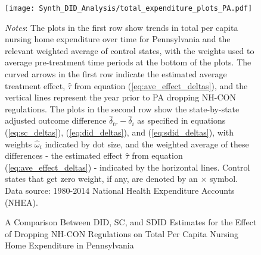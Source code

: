 \documentclass[../Main.tex]{subfiles}
\begin{document}
\newpage
\begin{figure}[t] 
	\begin{center}
	\caption{\label{fig:tot_exp_plots_pa} \centering A Comparison Between DID, SC, and SDID Estimates for the Effect of Dropping NH-CON Regulations on Total Per Capita Nursing Home Expenditure in Pennsylvania}
    \texttt{[image: Synth\_DID\_Analysis/total\_expenditure\_plots\_PA.pdf]}
    \end{center}
    \footnotesize
		\textit{Notes}: The plots in the first row show trends in total per capita nursing home expenditure over time for Pennsylvania and the relevant weighted average of control states, with the weights used to average pre-treatment time periods at the bottom of the plots. The curved arrows in the first row indicate the estimated average treatment effect, $\hat{\tau}$ from equation (\ref{eq:ave_effect_deltas}), and the vertical lines represent the year prior to PA dropping NH-CON regulations. The plots in the second row show the state-by-state adjusted outcome difference $\hat{\delta}_{tr}-\hat{\delta}_i$ as specified in equations (\ref{eq:sc_deltas}), (\ref{eq:did_deltas}), and (\ref{eq:sdid_deltas}), with weights $\hat{\omega}_i$ indicated by dot size, and the weighted average of these differences - the estimated effect $\hat{\tau}$ from equation (\ref{eq:ave_effect_deltas}) - indicated by the horizontal lines. Control states that get zero weight, if any, are denoted by an $\times$ symbol. Data source: 1980-2014 National Health Expenditure Accounts (NHEA).
\end{figure}
\clearpage
\end{document}
